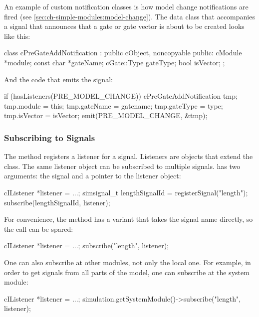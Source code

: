 An example of custom notification classes is how model change notifications
are fired (see \ref{sec:ch-simple-modules:model-change}). The data class
that accompanies a signal that announces that a gate or gate vector is
about to be created looks like this:

\begin{cpp}
class cPreGateAddNotification : public cObject, noncopyable
{
  public:
    cModule *module;
    const char *gateName;
    cGate::Type gateType;
    bool isVector;
};
\end{cpp}

And the code that emits the signal:

\begin{cpp}
if (hasListeners(PRE_MODEL_CHANGE))
{
    cPreGateAddNotification tmp;
    tmp.module = this;
    tmp.gateName = gatename;
    tmp.gateType = type;
    tmp.isVector = isVector;
    emit(PRE_MODEL_CHANGE, &tmp);
}
\end{cpp}


\subsubsection{Subscribing to Signals}

The  method registers a listener for a signal.
Listeners are objects that extend the  class.
The same listener object can be subscribed to multiple signals.
 has two arguments: the signal and a pointer to
the listener object:

\begin{cpp}
cIListener *listener = ...;
simsignal_t lengthSignalId = registerSignal("length");
subscribe(lengthSignalId, listener);
\end{cpp}

For convenience, the  method has a variant
that takes the signal name directly, so the 
call can be spared:

\begin{cpp}
cIListener *listener = ...;
subscribe("length", listener);
\end{cpp}

One can also subscribe at other modules, not only the local one.
For example, in order to get signals from all parts of the model,
one can subscribe at the system module:

\begin{cpp}
cIListener *listener = ...;
simulation.getSystemModule()->subscribe("length", listener);
\end{cpp}

